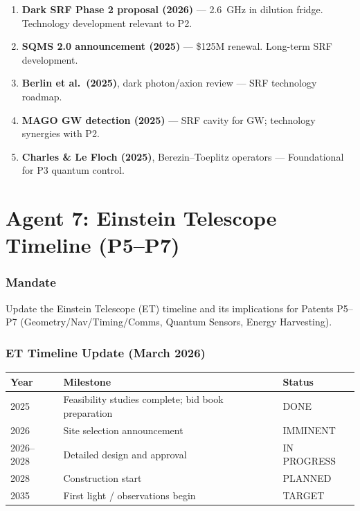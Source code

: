 \documentclass[11pt,a4paper]{article}
\begin{document}
\begin{enumerate}
\item \textbf{Dark SRF Phase 2 proposal (2026)} --- 2.6~GHz in dilution fridge. Technology development relevant to P2.
\item \textbf{SQMS 2.0 announcement (2025)} --- \$125M renewal. Long-term SRF development.
\item \textbf{Berlin et al.\ (2025)}, dark photon/axion review --- SRF technology roadmap.
\item \textbf{MAGO GW detection (2025)} --- SRF cavity for GW; technology synergies with P2.
\item \textbf{Charles \& Le Floch (2025)}, Berezin--Toeplitz operators --- Foundational for P3 quantum control.
\end{enumerate}


\part{Agent 7: Einstein Telescope Timeline (P5--P7)}
\label{part:agent7}

\section{Mandate}

Update the Einstein Telescope (ET) timeline and its implications for Patents P5--P7 (Geometry/Nav/Timing/Comms, Quantum Sensors, Energy Harvesting).

\section{ET Timeline Update (March 2026)}

\begin{center}
\begin{tabular}{lll}
\toprule
\textbf{Year} & \textbf{Milestone} & \textbf{Status} \\
\midrule
2025 & Feasibility studies complete; bid book preparation & DONE \\
2026 & Site selection announcement & IMMINENT \\
2026--2028 & Detailed design and approval & IN PROGRESS \\
2028 & Construction start & PLANNED \\
2035 & First light / observations begin & TARGET \\
\bottomrule
\end{tabular}
\end{center}
\end{document}
